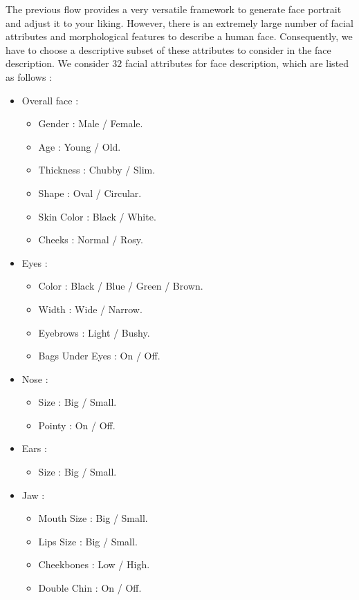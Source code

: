 The previous flow provides a very versatile framework to generate face portrait and adjust it to your liking. However, there is an extremely large number of facial attributes and morphological features to describe a human face. Consequently, we have to choose a descriptive subset of these attributes to consider in the face description. We consider $32$ facial attributes for face description, which are listed as follows :
\begin{itemize}
    \item Overall face :
    \begin{itemize}
        \item Gender : Male / Female.
        \item Age : Young / Old.
        \item Thickness : Chubby / Slim.
        \item Shape : Oval / Circular.
        \item Skin Color : Black / White.
        \item Cheeks : Normal / Rosy.
    \end{itemize}
    \item Eyes :
    \begin{itemize}
        \item Color : Black / Blue / Green / Brown.
        \item Width : Wide / Narrow.
        \item Eyebrows : Light / Bushy.
        \item Bags Under Eyes : On / Off.
    \end{itemize}
    \item Nose :
    \begin{itemize}
        \item Size : Big / Small.
        \item Pointy : On / Off.
    \end{itemize}
    \item Ears :
    \begin{itemize}
        \item Size : Big / Small.
    \end{itemize}
    \item Jaw :
    \begin{itemize}
        \item Mouth Size : Big / Small.
        \item Lips Size : Big / Small.
        \item Cheekbones : Low / High.
        \item Double Chin : On / Off.

\end{itemize}
\end{itemize}
